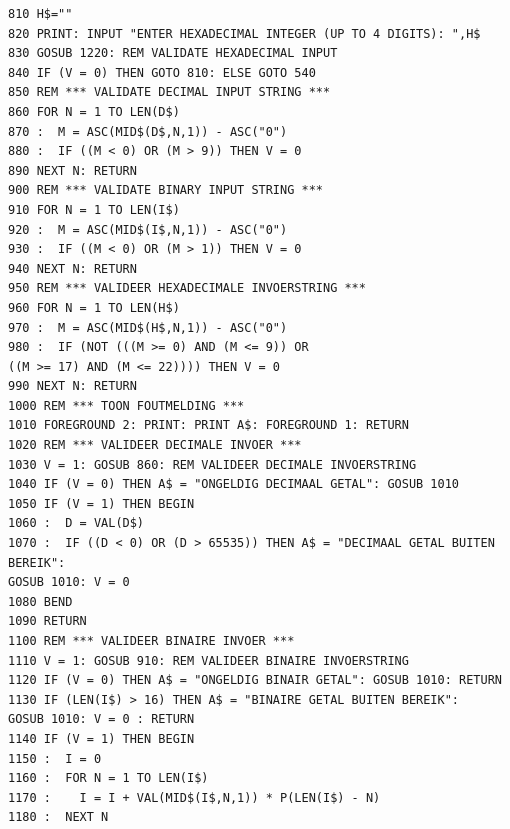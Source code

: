 \begin{tcolorbox}[colback=black,coltext=white]
\verbatimfont{\codefont}
\begin{verbatim}
810 H$=""
820 PRINT: INPUT "ENTER HEXADECIMAL INTEGER (UP TO 4 DIGITS): ",H$
830 GOSUB 1220: REM VALIDATE HEXADECIMAL INPUT
840 IF (V = 0) THEN GOTO 810: ELSE GOTO 540
850 REM *** VALIDATE DECIMAL INPUT STRING ***
860 FOR N = 1 TO LEN(D$)
870 :  M = ASC(MID$(D$,N,1)) - ASC("0")
880 :  IF ((M < 0) OR (M > 9)) THEN V = 0
890 NEXT N: RETURN
900 REM *** VALIDATE BINARY INPUT STRING ***
910 FOR N = 1 TO LEN(I$)
920 :  M = ASC(MID$(I$,N,1)) - ASC("0")
930 :  IF ((M < 0) OR (M > 1)) THEN V = 0
940 NEXT N: RETURN
950 REM *** VALIDEER HEXADECIMALE INVOERSTRING ***
960 FOR N = 1 TO LEN(H$)
970 :  M = ASC(MID$(H$,N,1)) - ASC("0")
980 :  IF (NOT (((M >= 0) AND (M <= 9)) OR
((M >= 17) AND (M <= 22)))) THEN V = 0
990 NEXT N: RETURN
1000 REM *** TOON FOUTMELDING ***
1010 FOREGROUND 2: PRINT: PRINT A$: FOREGROUND 1: RETURN
1020 REM *** VALIDEER DECIMALE INVOER ***
1030 V = 1: GOSUB 860: REM VALIDEER DECIMALE INVOERSTRING
1040 IF (V = 0) THEN A$ = "ONGELDIG DECIMAAL GETAL": GOSUB 1010
1050 IF (V = 1) THEN BEGIN
1060 :  D = VAL(D$)
1070 :  IF ((D < 0) OR (D > 65535)) THEN A$ = "DECIMAAL GETAL BUITEN BEREIK":
GOSUB 1010: V = 0
1080 BEND
1090 RETURN
1100 REM *** VALIDEER BINAIRE INVOER ***
1110 V = 1: GOSUB 910: REM VALIDEER BINAIRE INVOERSTRING
1120 IF (V = 0) THEN A$ = "ONGELDIG BINAIR GETAL": GOSUB 1010: RETURN
1130 IF (LEN(I$) > 16) THEN A$ = "BINAIRE GETAL BUITEN BEREIK":
GOSUB 1010: V = 0 : RETURN
1140 IF (V = 1) THEN BEGIN
1150 :  I = 0
1160 :  FOR N = 1 TO LEN(I$)
1170 :    I = I + VAL(MID$(I$,N,1)) * P(LEN(I$) - N)
1180 :  NEXT N
\end{verbatim}
\end{tcolorbox}
